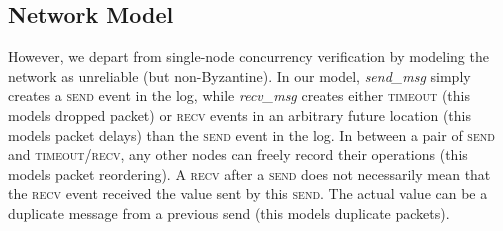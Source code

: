 
\subsection{Network Model}\label{subsec:network_modeling}

However, we depart from single-node concurrency verification by modeling the network as unreliable (but non-Byzantine). In our model, \textit{send\_msg} simply creates a \textsc{send} event in the log, while \textit{recv\_msg} creates either \textsc{timeout} (this models dropped packet) or \textsc{recv} events in an arbitrary future location (this models packet delays) than the \textsc{send} event in the log. In between a pair of \textsc{send} and \textsc{timeout/recv}, any other nodes can freely record their operations (this models packet reordering). A \textsc{recv} after a \textsc{send} does not necessarily mean that the \textsc{recv} event received the value sent by this \textsc{send}. The actual value can be a duplicate message from a previous send (this models duplicate packets).

